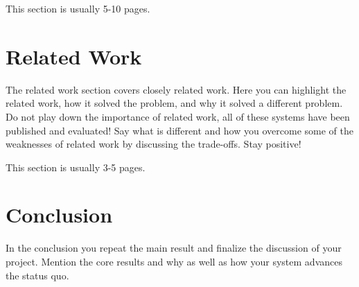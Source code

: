 \documentclass[a4paper,11pt,oneside]{report}
\begin{document}
This section is usually 5-10 pages.


\chapter{Related Work}

The related work section covers closely related work. Here you can highlight
the related work, how it solved the problem, and why it solved a different
problem. Do not play down the importance of related work, all of these
systems have been published and evaluated! Say what is different and how
you overcome some of the weaknesses of related work by discussing the 
trade-offs. Stay positive!

This section is usually 3-5 pages.


\chapter{Conclusion}

In the conclusion you repeat the main result and finalize the discussion of
your project. Mention the core results and why as well as how your system
advances the status quo.

\cleardoublepage
{}
{}
\printbibliography

%
%
\end{document}
